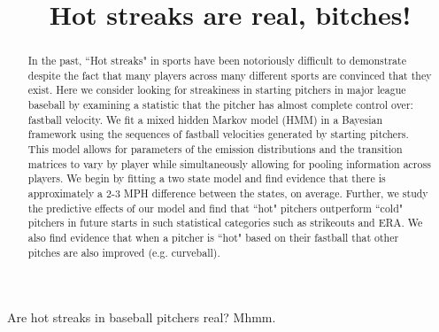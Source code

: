 \documentclass[letterpaper,12pt]{article}\usepackage[]{graphicx}\usepackage[]{color}
\begin{document}
\begin{center} Are hot streaks in baseball pitchers real?  Mhmm.
\end{center}


\begin{abstract} 
In the past, ``Hot streaks" in sports have been notoriously difficult to demonstrate despite the fact that many players across many different sports are convinced that they exist.  Here we consider looking for streakiness in starting pitchers in major league baseball by examining a statistic that the pitcher has almost complete control over: fastball velocity.  We fit a mixed hidden Markov model (HMM) in a Bayesian framework using the sequences of fastball velocities generated by starting pitchers. This model allows for parameters of the emission distributions and the transition matrices to vary by player while simultaneously allowing for pooling information across players.  We begin by fitting a two state model and find evidence that there is approximately a 2-3 MPH difference between the states, on average.  Further, we study the predictive effects of our model and find that ``hot" pitchers outperform ``cold" pitchers in future starts in such statistical categories such as strikeouts and ERA.  We also find evidence that when a pitcher is ``hot" based on their fastball that other pitches are also improved (e.g. curveball). 

  \end{abstract}

\doublespacing





\title{Hot streaks are real, bitches!}


\end{document}
